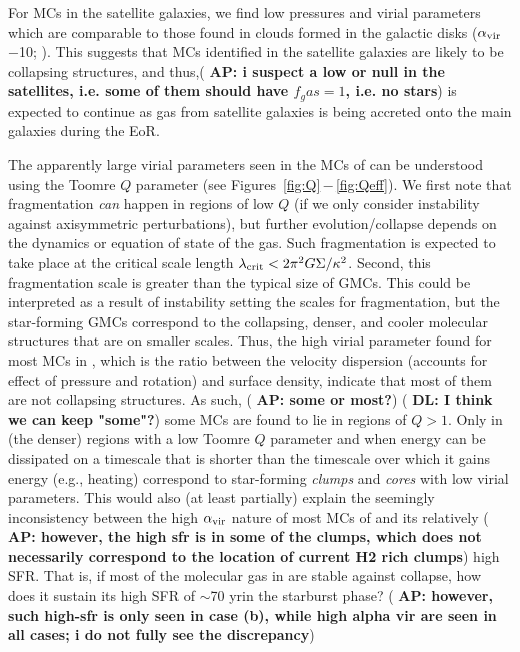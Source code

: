 \IfFileExists{emulateapjlegacy.cls}{\documentclass[iop]{emulateapjlegacy}}{\documentclass[iop]{emulateapj}}
\newcommand{\AP}[1]{({\bf \color{apcolor} AP: #1})}
\newcommand{\DL}[1]{({\bf \color{dlcolor} DL: #1})}
\begin{document}
For MCs in the satellite galaxies, we find low pressures and virial parameters  which are comparable to those found in clouds formed in the galactic disks  ($\alpha_{\rm vir}$$-$10; \citealt{Dobbs08a, Tasker09a}).
This suggests that MCs identified in the satellite galaxies are likely to be collapsing structures, and thus,\AP{i suspect a low or null \SF in the satellites, i.e. some of them should have $f_gas = 1$, i.e. no stars} \SF is expected to continue as gas from satellite galaxies is being accreted onto the main galaxies during the EoR.

The apparently large virial parameters seen in the MCs of \flower can be understood using the Toomre $Q$ parameter (see Figures~\ref{fig:Q}\,$-$\,\ref{fig:Qeff}). We first note that fragmentation {\it can} happen in regions of low $Q$ (if we only consider instability against axisymmetric perturbations), but further evolution/collapse depends on the dynamics or equation of state of the gas.
%
Such fragmentation is expected to take place at the critical scale length $\lambda_{\rm crit} < 2 \pi^2 G \Sigma / \kappa^2$. Second, this fragmentation scale is greater than the typical size of GMCs. This could be interpreted as a result of instability setting the scales for fragmentation, but the star-forming GMCs correspond to the collapsing, denser, and cooler molecular structures that are on smaller scales. 
%
Thus, the high virial parameter found for most MCs in \flower, which is the ratio between the velocity dispersion (accounts for effect of pressure and rotation) and surface density, indicate that most of them are not collapsing structures. As such, \AP{some or most?} 
\DL{I think we can keep "some"?}
some MCs are found to lie in regions of $Q>1$. 
Only in (the denser) regions with a low Toomre $Q$ parameter and when energy can be dissipated on a timescale that is shorter than the timescale over which it gains energy (e.g., heating) correspond to star-forming {\it clumps} and {\it cores} with low virial parameters.
%
This would also (at least partially) explain the seemingly inconsistency between the high $\alpha_{\rm vir}$ nature of most MCs of \flower and its relatively \AP{however, the high sfr is in some of the clumps, which does not necessarily correspond to the location of current H2 rich clumps} high SFR. That is, if most of the molecular gas in \flower are stable against collapse, how does it sustain its high SFR of $\sim$70\,\Msun\,yr\pmOne in the starburst phase?
%
\AP{however, such high-sfr is only seen in case (b), while high alpha vir are seen in all cases; i do not fully see the discrepancy} 
\end{document}

